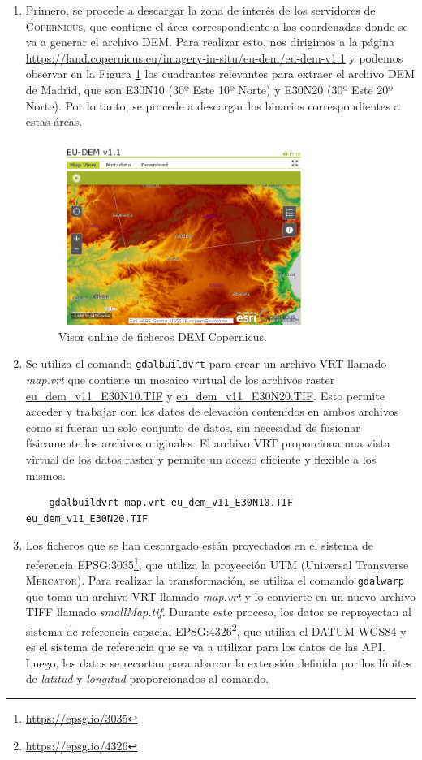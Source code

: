 \documentclass[a4paper, 11pt]{book}
\begin{document}
\begin{enumerate}
    \item Primero, se procede a descargar la zona de interés de los servidores de \textsc{Copernicus}, que contiene el área correspondiente a las coordenadas donde se va a generar el archivo \textsc{DEM}. Para realizar esto, nos dirigimos a la página \url{https://land.copernicus.eu/imagery-in-situ/eu-dem/eu-dem-v1.1} y podemos observar en la Figura \ref{fig:copernicus} los cuadrantes relevantes para extraer el archivo \textsc{DEM} de Madrid, que son \textsc{E30N10} (30º Este 10º Norte) y \textsc{E30N20} (30º Este 20º Norte). Por lo tanto, se procede a descargar los binarios correspondientes a estas áreas.
\begin{figure}[h]
  \centering
  \includegraphics[width=8cm, keepaspectratio]{img/copernicus.jpg}
  \caption{Visor online de ficheros DEM Copernicus.}
  \label{fig:copernicus}
\end{figure}
    \item Se utiliza el comando \texttt{gdalbuildvrt} para crear un archivo \textsc{VRT} llamado \emph{map.vrt} que contiene un mosaico virtual de los archivos \gls{raster} \url{eu_dem_v11_E30N10.TIF} y \url{eu_dem_v11_E30N20.TIF}. Esto permite acceder y trabajar con los datos de elevación contenidos en ambos archivos como si fueran un solo conjunto de datos, sin necesidad de fusionar físicamente los archivos originales. El archivo \textsc{VRT} proporciona una vista virtual de los datos raster y permite un acceso eficiente y flexible a los mismos.

    {\scriptsize
    \begin{verbatim}
    gdalbuildvrt map.vrt eu_dem_v11_E30N10.TIF eu_dem_v11_E30N20.TIF
    \end{verbatim}
    }
    
    \item Los ficheros que se han descargado están proyectados en el sistema de referencia \textsc{EPSG:3035}\footnote{\url{https://epsg.io/3035}}, que utiliza la proyección \textsc{UTM} (Universal Transverse \textsc{Mercator}). Para realizar la transformación, se utiliza el comando \texttt{gdalwarp} que toma un archivo \textsc{VRT} llamado \emph{map.vrt} y lo convierte en un nuevo archivo \textsc{TIFF} llamado \emph{smallMap.tif}. Durante este proceso, los datos se reproyectan al sistema de referencia espacial \textsc{EPSG:4326}\footnote{\url{https://epsg.io/4326}}, que utiliza el \textsc{DATUM WGS84} y es el sistema de referencia que se va a utilizar para los datos de las \gls{API}. Luego, los datos se recortan para abarcar la extensión definida por los límites de \emph{latitud} y \emph{longitud} proporcionados al comando.


\end{enumerate}
\end{document}
